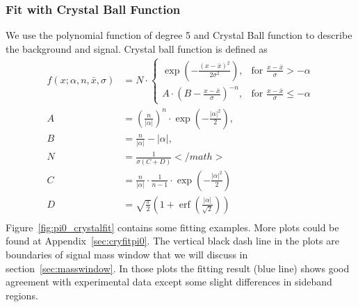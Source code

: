 \subsubsection{Fit with Crystal Ball Function}
We use the polynomial function of degree 5 and Crystal Ball function to describe the background and signal. Crystal ball function is defined as~\cite{CrystalBallFunc}
\begin{subequations}
\begin{align}
f(x;\alpha,n,\bar x,\sigma) & = N \cdot \begin{cases} \exp(- \frac{(x - \bar x)^2}{2 \sigma^2}), & \mbox{for }\frac{x - \bar x}{\sigma} > -\alpha \\
 A \cdot (B - \frac{x - \bar x}{\sigma})^{-n}, & \mbox{for }\frac{x - \bar x}{\sigma} \leqslant -\alpha \end{cases}\\
A & = \left(\frac{n}{\left| \alpha \right|}\right)^n \cdot \exp\left(- \frac {\left| \alpha \right|^2}{2}\right), \\
B &= \frac{n}{\left| \alpha \right|}  - \left| \alpha \right|,\\
N &= \frac{1}{\sigma (C + D)}</math>\\
C &= \frac{n}{\left| \alpha \right|} \cdot \frac{1}{n-1} \cdot \exp\left(- \frac {\left| \alpha \right|^2}{2}\right) \\
D &= \sqrt{\frac{\pi}{2}} \left(1 + \operatorname{erf}\left(\frac{\left| \alpha \right|}{\sqrt 2}\right)\right) \\
\end{align}
\label{eqn:crystalball}
\end{subequations}
Figure~\ref{fig:pi0_crystalfit} contains some fitting examples. More plots could be found at Appendix~\ref{sec:cryfitpi0}. The vertical black dash line in the plots are boundaries of signal mass window that we will discuss in section~\ref{sec:masswindow}. In those plots the fitting result (blue line) shows good agreement with experimental data except some slight differences in sideband regions. 
